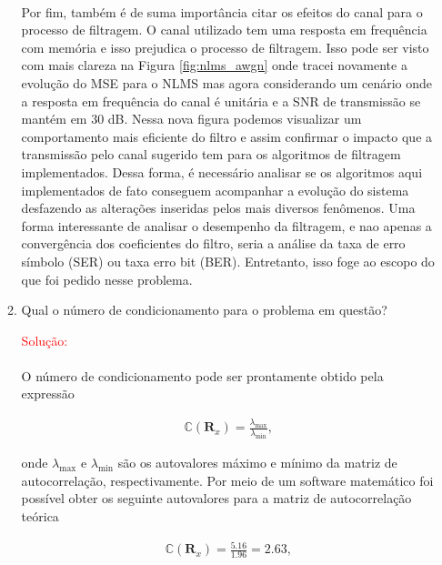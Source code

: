\documentclass[a4paper,10pt]{article}
\begin{document}
\begin{enumerate}
\begin{enumerate}
						\paragraph{}Por fim, também é de suma importância citar os efeitos do canal para o processo de filtragem. O canal utilizado tem uma resposta em frequência com memória e isso prejudica o processo de filtragem. Isso pode ser visto com mais clareza
						na Figura \ref{fig:nlms_awgn} onde tracei novamente a evolução do MSE para o NLMS mas agora considerando um cenário onde a resposta em frequência do canal é unitária e a SNR de transmissão se mantém em 30 dB. Nessa nova figura 
						podemos visualizar um comportamento mais eficiente do filtro e assim confirmar o impacto que a transmissão pelo canal sugerido tem para os algoritmos de filtragem implementados. Dessa forma, é necessário analisar se os algoritmos aqui 
						implementados de fato conseguem acompanhar a evolução do sistema desfazendo as alterações inseridas pelos mais diversos fenômenos. Uma forma interessante de analisar o desempenho da filtragem, e nao apenas a convergência dos coeficientes 
						do filtro, seria a análise da taxa de erro símbolo (SER) ou taxa erro bit (BER). Entretanto, isso foge ao escopo do que foi pedido nesse problema.
					
					\item Qual o número de condicionamento para o problema em questão?
					
						\textcolor{red}{Solução:}
						
						\paragraph{}O número de condicionamento pode ser prontamente obtido pela expressão

						\begin{align}
							\mathbb{C} (\mathbf{R}_{x}) = \frac{\lambda_{\text{max}}}{\lambda_{\text{min}}},
						\end{align}
					
						onde $\lambda_{\text{max}}$ e $\lambda_{\text{min}}$ são os autovalores máximo e mínimo da matriz de autocorrelação, respectivamente. Por meio de um software
						matemático foi possível obter os seguinte autovalores para a matriz de autocorrelação teórica

						\begin{align}
							\mathbb{C} (\mathbf{R}_{x}) = \frac{5.16}{1.96} = 2.63,
						\end{align}


\end{enumerate}
\end{enumerate}
\end{document}

